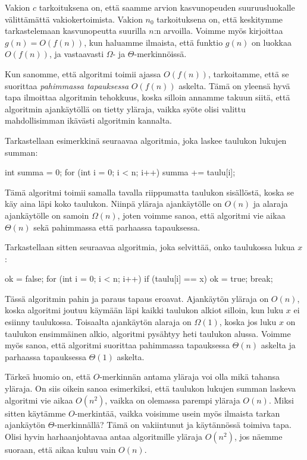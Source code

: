 Vakion $c$ tarkoituksena on, että saamme arvion kasvunopeuden suuruusluokalle välittämättä
vakiokertoimista. Vakion $n_0$ tarkoituksena on, että keskitymme tarkastelemaan
kasvunopeutta suurilla $n$:n arvoilla.
Voimme myös kirjoittaa $g(n)=O(f(n))$, kun haluamme ilmaista,
että funktio $g(n)$ on luokkaa $O(f(n))$,
ja vastaavasti $\Omega$- ja $\Theta$-merkinnöissä.

Kun sanomme, että algoritmi toimii ajassa $O(f(n))$, tarkoitamme, että se suorittaa
\emph{pahimmassa tapauksessa} $O(f(n))$ askelta.
Tämä on yleensä hyvä tapa ilmoittaa algoritmin tehokkuus,
koska silloin annamme takuun siitä, että algoritmin ajankäytöllä on tietty yläraja,
vaikka syöte olisi valittu mahdollisimman ikävästi algoritmin kannalta.

Tarkastellaan esimerkkinä seuraavaa algoritmia, joka laskee
taulukon lukujen summan:

\begin{code}
int summa = 0;
for (int i = 0; i < n; i++) {
    summa += taulu[i];
}
\end{code}

Tämä algoritmi toimii samalla tavalla riippumatta taulukon sisällöstä,
koska se käy aina läpi koko taulukon.
Niinpä yläraja ajankäytölle on $O(n)$ ja alaraja ajankäytölle on samoin $\Omega(n)$,
joten voimme sanoa, että algoritmi vie aikaa $\Theta(n)$ sekä pahimmassa
että parhaassa tapauksessa.

Tarkastellaan sitten seuraavaa algoritmia, joka selvittää,
onko taulukossa lukua $x$:

\begin{code}
ok = false;
for (int i = 0; i < n; i++) {
    if (taulu[i] == x) {
        ok = true;
        break;
    }
}
\end{code}

Tässä algoritmin pahin ja paraus tapaus eroavat.
Ajankäytön yläraja on $O(n)$, koska algoritmi joutuu käymään
läpi kaikki taulukon alkiot silloin, kun luku $x$
ei esiinny taulukossa.
Toisaalta ajankäytön alaraja on $\Omega(1)$,
koska jos luku $x$ on taulukon ensimmäinen alkio,
algoritmi pysähtyy heti taulukon alussa.
Voimme myös sanoa, että algoritmi suorittaa pahimmassa
tapauksessa $\Theta(n)$ askelta ja parhaassa tapauksessa
$\Theta(1)$ askelta.

Tärkeä huomio on, että $O$-merkinnän antama yläraja voi olla mikä tahansa yläraja.
On siis oikein sanoa esimerkiksi, että taulukon lukujen summan
laskeva algoritmi vie aikaa $O(n^2)$, vaikka on olemassa parempi yläraja $O(n)$.
Miksi sitten käytämme $O$-merkintää, vaikka voisimme usein myös ilmaista tarkan
ajankäytön $\Theta$-merkinnällä?
Tämä on vakiintunut ja käytännössä toimiva tapa.
Olisi hyvin harhaanjohtavaa antaa algoritmille yläraja $O(n^2)$,
jos näemme suoraan, että aikaa kuluu vain $O(n)$.

